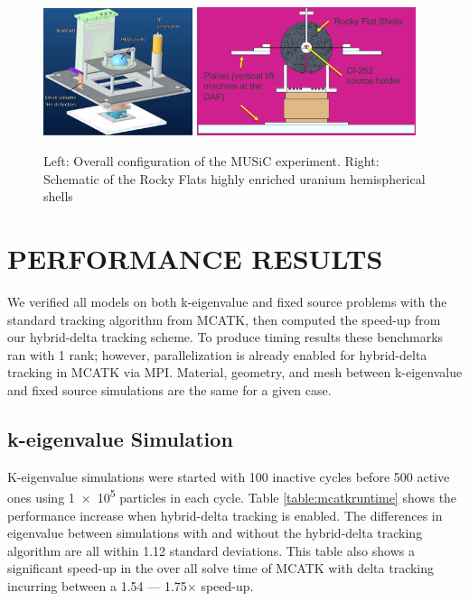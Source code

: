 \begin{figure}[!htb]
  \centering
  \includegraphics[width=0.39\textwidth]{appendix/mcatk_figures/MUSiC/music_config.png}
  \includegraphics[width=0.57\textwidth]{appendix/mcatk_figures/MUSiC/rocky_flats.png}
  \caption{Left: Overall configuration of the MUSiC experiment. Right: Schematic of the Rocky Flats highly enriched uranium hemispherical shells \cite{osti_1781360} }
  \label{fig:music}
\end{figure}

\section{PERFORMANCE RESULTS} 
\label{sec:mcatkresults}

We verified all models on both k-eigenvalue and fixed source problems with the standard tracking algorithm from MCATK, then computed the speed-up from our hybrid-delta tracking scheme.
To produce timing results these benchmarks ran with 1 rank; however, parallelization is already enabled for hybrid-delta tracking in MCATK via MPI.
Material, geometry, and mesh between k-eigenvalue and fixed source simulations are the same for a given case.

\subsection{k-eigenvalue Simulation}
K-eigenvalue simulations were started with 100 inactive cycles before 500 active ones using \num{1e5} particles in each cycle.
Table \ref{table:mcatkruntime} shows the performance increase when hybrid-delta tracking is enabled.
The differences in eigenvalue between simulations with and without the hybrid-delta tracking algorithm are all within 1.12 standard deviations. This table also shows a significant speed-up in the over all solve time of MCATK with delta tracking incurring between a 1.54 --- 1.75$\times$ speed-up.

